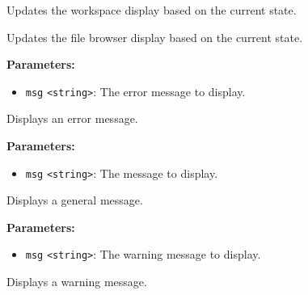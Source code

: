 \documentclass[12pt,a4paper]{article}
\begin{document}
\vspace{5mm}
\noindent {}


\noindent Updates the workspace display based on the current state.

\vspace{5mm}
\noindent {}


\noindent Updates the file browser display based on the current state.

\vspace{5mm}
\noindent {}


\noindent \textbf{Parameters:}
\begin{itemize}
  \item \texttt{msg} \texttt{<string>}: The error message to display.
\end{itemize}

\noindent Displays an error message.

\vspace{5mm}
\noindent {}


\noindent \textbf{Parameters:}
\begin{itemize}
  \item \texttt{msg} \texttt{<string>}: The message to display.
\end{itemize}

\noindent Displays a general message.

\vspace{5mm}
\noindent {}


\noindent \textbf{Parameters:}
\begin{itemize}
  \item \texttt{msg} \texttt{<string>}: The warning message to display.
\end{itemize}

\noindent Displays a warning message.
\end{document}
